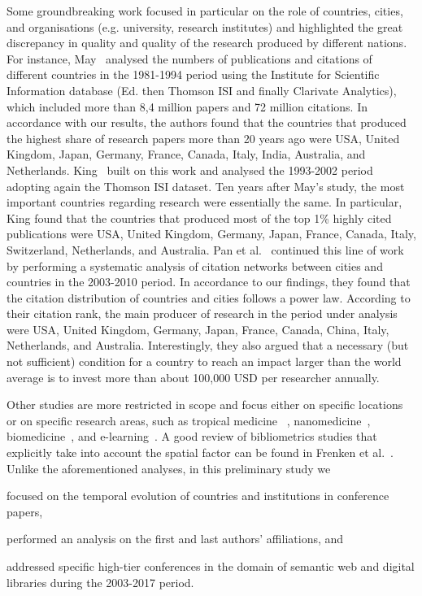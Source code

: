 \documentclass{llncs}
\begin{document}
Some groundbreaking work focused in particular on the role of countries, cities, and organisations (e.g. university, research institutes) and highlighted the great discrepancy in quality and quality of the research produced by different nations. For instance, May~\cite{may1997} analysed the numbers of publications and citations of different countries in the 1981-1994 period using the Institute for Scientific Information database (Ed. then Thomson ISI and finally Clarivate Analytics), which included more than 8,4 million papers and 72 million citations. 
In accordance with our results, the authors found that the countries that produced the highest share of research papers more than 20 years ago were USA, United Kingdom, Japan, Germany, France, Canada, Italy, India, Australia, and Netherlands. King~\cite{king2004a} built on this work and analysed the 1993-2002 period adopting again the Thomson ISI dataset. 
Ten years after May's study, the most important countries regarding research were essentially the same.
In particular, King found that the countries that produced most of the top 1\% highly cited publications were USA, United Kingdom, Germany, Japan, France, Canada, Italy, Switzerland, Netherlands, and Australia. Pan et al.~\cite{pan2012} continued this line of work by performing a systematic analysis of citation networks between cities and countries in the 2003-2010 period. 
In accordance to our findings, they found that the citation distribution of countries and cities follows a power law.
According to their citation rank, the main producer of research in the period under analysis were USA, United Kingdom, Germany, Japan, France, Canada, China, Italy, Netherlands, and Australia.
Interestingly, they also argued that a necessary (but not sufficient) condition for a country to reach an impact larger than the world average is to invest more than about 100,000 USD per researcher annually.

Other studies are more restricted in scope and focus either on specific locations~\cite{carvalho2006,borner2005spatio,monroe2016inequalities} or on specific research areas, such as tropical medicine ~\cite{falagas2006bibliometric}, nanomedicine~\cite{woodson2012research}, biomedicine~\cite{falagas2006bibliometric2}, and e-learning~\cite{hung2012trends}. 
A good review of bibliometrics studies that explicitly take into account the spatial factor can be found in Frenken et al.~\cite{frenken2009}.
Unlike the aforementioned analyses, in this preliminary study we 
\begin{enumerate*}[label=(\roman*)]
\item focused on the temporal evolution of countries and institutions in conference papers,
\item performed an analysis on the first and last authors' affiliations, and
\item addressed specific high-tier conferences in the domain of semantic web and digital libraries during the 2003-2017 period.
\end{enumerate*}
\end{document}

